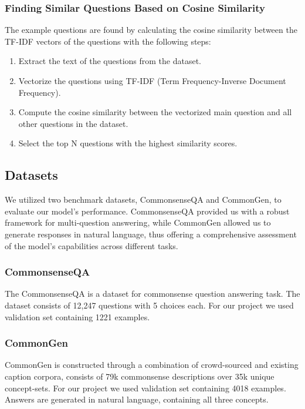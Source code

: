 \documentclass[fleqn,moreauthors,10pt]{ds_report}
\begin{document}
\subsubsection*{Finding Similar Questions Based on Cosine Similarity}

The example questions are found by calculating the cosine similarity between the TF-IDF vectors of the questions with the following steps:

\begin{enumerate}
    \item Extract the text of the questions from the dataset.
    \item Vectorize the questions using TF-IDF (Term Frequency-Inverse Document Frequency).
    \item Compute the cosine similarity between the vectorized main question and all other questions in the dataset.
    \item Select the top N questions with the highest similarity scores.
\end{enumerate}

\subsection*{Datasets}
We utilized two benchmark datasets, CommonsenseQA and CommonGen, to evaluate our model's performance. CommonsenseQA provided us with a robust framework for multi-question answering, while CommonGen allowed us to generate responses in natural language, thus offering a comprehensive assessment of the model's capabilities across different tasks.
\subsubsection*{CommonsenseQA}
The CommonsenseQA is a dataset for commonsense question answering task. The dataset consists of 12,247 questions with 5 choices each. For our project we used validation set containing 1221 examples. \cite{talmor-etal-2019-commonsenseqa}
\subsubsection*{CommonGen}
CommonGen is constructed through a combination of crowd-sourced and existing caption corpora, consists of 79k commonsense descriptions over 35k unique concept-sets. For our project we used validation set containing 4018 examples. Answers are generated in natural language, containing all three concepts. \cite{lin-etal-2020-commongen}
\end{document}

